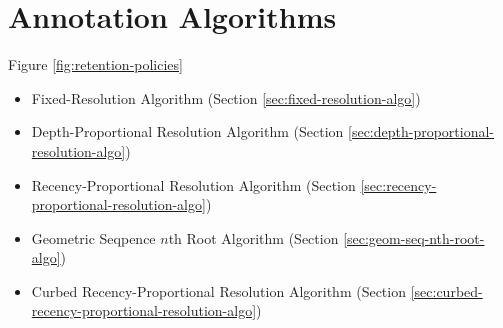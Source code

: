 \section{Annotation Algorithms} \label{sec:annotation}



Figure \ref{fig:retention-policies}

\begin{itemize}
\item Fixed-Resolution Algorithm (Section \ref{sec:fixed-resolution-algo})
\item Depth-Proportional Resolution Algorithm (Section \ref{sec:depth-proportional-resolution-algo})
\item Recency-Proportional Resolution Algorithm (Section \ref{sec:recency-proportional-resolution-algo})
\item Geometric Seqpence $n$th Root Algorithm (Section \ref{sec:geom-seq-nth-root-algo})
\item Curbed Recency-Proportional Resolution Algorithm (Section \ref{sec:curbed-recency-proportional-resolution-algo})
\end{itemize}











